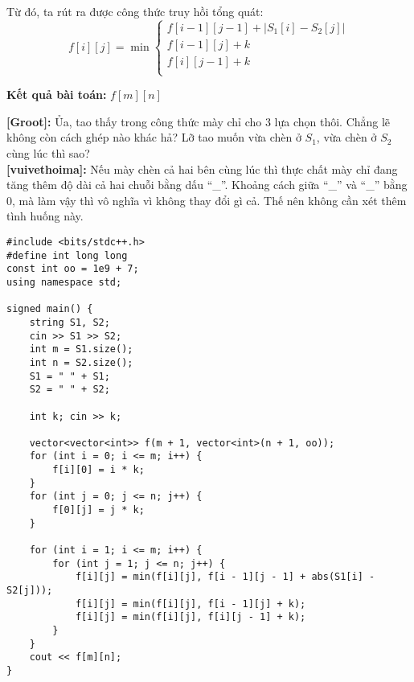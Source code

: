 Từ đó, ta rút ra được công thức truy hồi tổng quát:
\[
f[i][j] = \min
\begin{cases}
    f[i - 1][j - 1] + |S_1[i] - S_2[j]| \\
    f[i - 1][j] + k \\
    f[i][j - 1] + k \\
\end{cases}
\]

\textbf{Kết quả bài toán:} $f[m][n]$


\textbf{[Groot]:} Ủa, tao thấy trong công thức mày chỉ cho 3 lựa chọn thôi. 
Chẳng lẽ không còn cách ghép nào khác hả?  
Lỡ tao muốn vừa chèn ở $S_1$, vừa chèn ở $S_2$ cùng lúc thì sao?\\

\textbf{[vuivethoima]:} Nếu mày chèn cả hai bên cùng lúc thì 
thực chất mày chỉ đang tăng thêm độ dài cả hai chuỗi bằng dấu ``\_''. 
Khoảng cách giữa ``\_'' và ``\_'' bằng 0, 
mà làm vậy thì vô nghĩa vì không thay đổi gì cả.  
Thế nên không cần xét thêm tình huống này.

\begin{lstlisting}[title=\centering \textbf{Cài đặt}]
#include <bits/stdc++.h>
#define int long long
const int oo = 1e9 + 7;
using namespace std;

signed main() {
    string S1, S2;
    cin >> S1 >> S2;
    int m = S1.size();
    int n = S2.size();
    S1 = " " + S1;
    S2 = " " + S2;

    int k; cin >> k;

    vector<vector<int>> f(m + 1, vector<int>(n + 1, oo));
    for (int i = 0; i <= m; i++) {
        f[i][0] = i * k;
    }
    for (int j = 0; j <= n; j++) {
        f[0][j] = j * k;
    }

    for (int i = 1; i <= m; i++) {
        for (int j = 1; j <= n; j++) {
            f[i][j] = min(f[i][j], f[i - 1][j - 1] + abs(S1[i] - S2[j]));
            f[i][j] = min(f[i][j], f[i - 1][j] + k);
            f[i][j] = min(f[i][j], f[i][j - 1] + k);
        }
    }
    cout << f[m][n];
}

\end{lstlisting}

